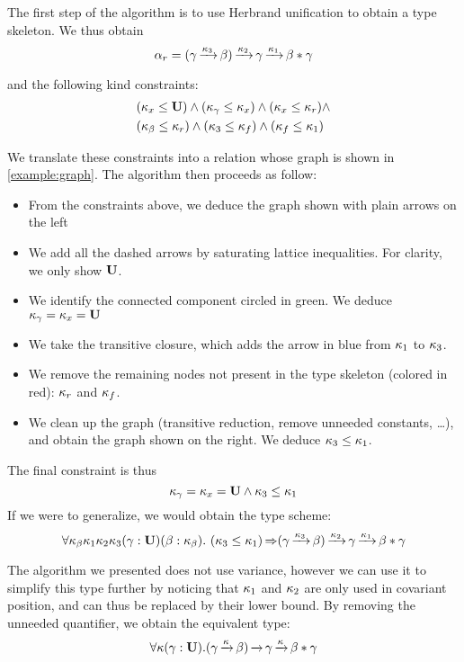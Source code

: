 The first step of the algorithm is to use Herbrand unification to obtain
a type skeleton. We thus obtain
$$\alpha_r =
(\gamma \operatorname{\xrightarrow{\kappa_3}} \beta) \operatorname{\xrightarrow{\kappa_2}} \gamma \operatorname{\xrightarrow{\kappa_1}} \beta * \gamma$$

and the following kind constraints: 
\[\begin{aligned}
    &(\kappa_x \leq \mathbf{U})
    \wedge
    (\kappa_\gamma \leq \kappa_x)
    \wedge
    (\kappa_x \leq \kappa_r)
    \wedge\\
    &(\kappa_\beta \leq \kappa_r)
    \wedge
    (\kappa_3 \leq \kappa_f)
    \wedge
    (\kappa_f \leq \kappa_1)
\end{aligned}\]

We translate these constraints into a relation whose graph
is shown in \cref{example:graph}.
%
The algorithm then proceeds as follow:
\begin{itemize}[noitemsep]
\item From the constraints above, we deduce the graph shown
  with plain arrows on the left
\item We add all the dashed arrows by saturating
  lattice inequalities. For clarity, we only show $\mathbf{U}$.
\item We identify the connected component circled in
  {\color{green} green}.
  We deduce $\kappa_\gamma = \kappa_x = \mathbf{U}$
\item We take the transitive closure, which adds the
  arrow in {\color{blue} blue} from $\kappa_1$ to $\kappa_3$.
\item We remove the remaining nodes not present in the type skeleton (colored in {\color{red} red}): $\kappa_r$ and $\kappa_f$.
\item We clean up the graph (transitive reduction, remove unneeded constants, \dots),
  and obtain the graph shown on the right.
  We deduce $\kappa_3 \leq \kappa_1$.
\end{itemize}

The final constraint is thus
$$\kappa_\gamma = \kappa_x = \mathbf{U} \wedge \kappa_3 \leq \kappa_1$$
If we were to generalize, we would obtain the type scheme:
$$\forall \kvar_\beta \kvar_1 \kvar_2 \kvar_3
(\gamma : \kun) (\beta : \kvar_\beta).\ %
\qual
{\Cleq{\kvar_3}{\kvar_1}}
{(\gamma \tarr{\kvar_3} \beta) \tarr{\kvar_2} \gamma \tarr{\kvar_1} \beta * \gamma}$$

The algorithm we presented does not use variance, however we can use it to
simplify this type further by noticing that $\kappa_1$ and $\kappa_2$ are only
used in covariant position, and can thus be replaced by their lower bound.
By removing the unneeded quantifier, we obtain the equivalent type:
$$
\forall \kappa
(\gamma : \mathbf{U}).
{(\gamma \operatorname{\xrightarrow{\kappa}} \beta) \operatorname{\xrightarrow{}} \gamma \operatorname{\xrightarrow{\kappa}} \beta * \gamma}$$



